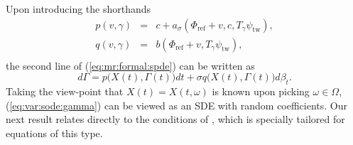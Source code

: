 \documentclass[10pt]{articleHJ}
\newcommand{\sref}[1]{(\ref{#1})}                       %
\numberwithin{equation}{section}
\begin{document}
Upon introducing the shorthands
\begin{equation}
\begin{array}{lcl}
  p(v, \gamma) & = &
    c + a_{\sigma}( \Phi_{\mathrm{ref}} + v , c, T_{\gamma} \psi_{\mathrm{tw}} ) ,
\\[0.2cm]
  q(v, \gamma) & = & b( \Phi_{\mathrm{ref}} + v,  T_{\gamma} \psi_{\mathrm{tw}} ) ,
\\[0.2cm]
\end{array}
\end{equation}
the second line of
\sref{eq:mr:formal:spde}
can be written as
\begin{equation}
\label{eq:var:sode:gamma}
d \Gamma = p\big(X(t), \Gamma(t)\big) dt
   + \sigma q\big(X(t), \Gamma(t)\big) d \beta_t.
\end{equation}
Taking the view-point that $X(t) = X(t, \omega)$
is known upon picking $\omega \in \Omega$,
\sref{eq:var:sode:gamma} can be viewed as an SDE
with random coefficients. Our next result
relates directly to the conditions of
\cite[Thm 3.1.1]{Concise}, which is specially
tailored for equations of this type.
\end{document}
